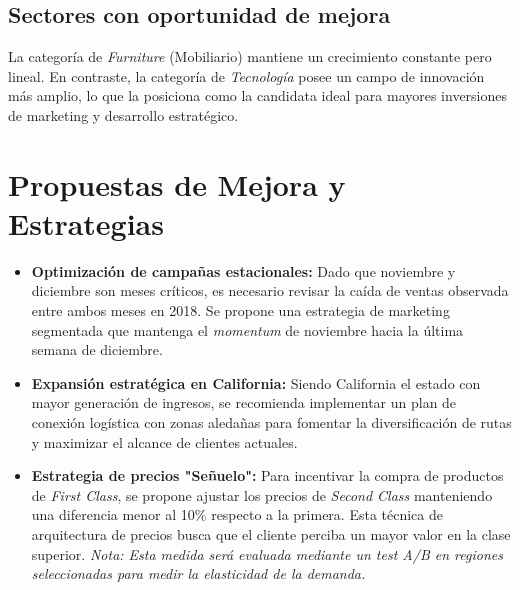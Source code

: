 \documentclass[12pt,a4paper]{article}
\begin{document}
\subsection{Sectores con oportunidad de mejora}
La categoría de \textit{Furniture} (Mobiliario) mantiene un crecimiento constante pero lineal. En contraste, la categoría de \textit{Tecnología} posee un campo de innovación más amplio, lo que la posiciona como la candidata ideal para mayores inversiones de marketing y desarrollo estratégico.

\section{Propuestas de Mejora y Estrategias}

\begin{itemize}
    \item \textbf{Optimización de campañas estacionales:} Dado que noviembre y diciembre son meses críticos, es necesario revisar la caída de ventas observada entre ambos meses en 2018. Se propone una estrategia de marketing segmentada que mantenga el \textit{momentum} de noviembre hacia la última semana de diciembre.
    
    \item \textbf{Expansión estratégica en California:} Siendo California el estado con mayor generación de ingresos, se recomienda implementar un plan de conexión logística con zonas aledañas para fomentar la diversificación de rutas y maximizar el alcance de clientes actuales.
    
    \item \textbf{Estrategia de precios "Señuelo":} Para incentivar la compra de productos de \textit{First Class}, se propone ajustar los precios de \textit{Second Class} manteniendo una diferencia menor al 10\% respecto a la primera. Esta técnica de arquitectura de precios busca que el cliente perciba un mayor valor en la clase superior. 
    \textit{Nota: Esta medida será evaluada mediante un test A/B en regiones seleccionadas para medir la elasticidad de la demanda.}
\end{itemize}
\end{document}
